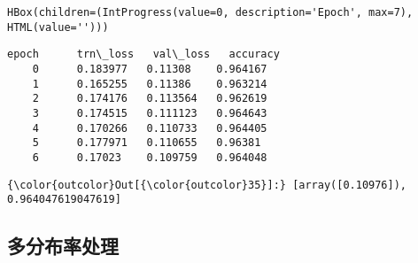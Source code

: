 \documentclass[11pt]{article}
\begin{document}
    
    \begin{verbatim}
HBox(children=(IntProgress(value=0, description='Epoch', max=7), HTML(value='')))
    \end{verbatim}

    
    \begin{Verbatim}[commandchars=\\\{\}]
epoch      trn\_loss   val\_loss   accuracy                    
    0      0.183977   0.11308    0.964167  
    1      0.165255   0.11386    0.963214                    
    2      0.174176   0.113564   0.962619                    
    3      0.174515   0.111123   0.964643                    
    4      0.170266   0.110733   0.964405                    
    5      0.177971   0.110655   0.96381                     
    6      0.17023    0.109759   0.964048                    

    \end{Verbatim}

\begin{Verbatim}[commandchars=\\\{\}]
{\color{outcolor}Out[{\color{outcolor}35}]:} [array([0.10976]), 0.964047619047619]
\end{Verbatim}
            
    \hypertarget{ux591aux5206ux5e03ux7387ux5904ux7406}{%
\subsection{多分布率处理}\label{ux591aux5206ux5e03ux7387ux5904ux7406}}
\end{document}
